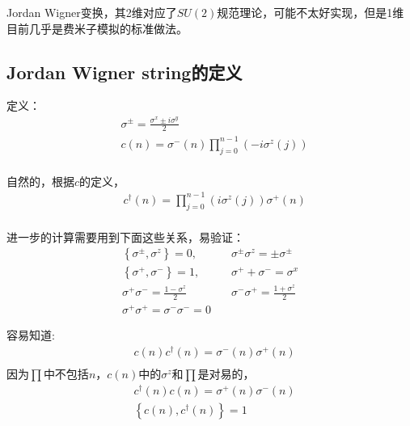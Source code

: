 Jordan Wigner变换，其2维对应了$SU(2)$规范理论，可能不太好实现，但是1维目前几乎是费米子模拟的标准做法。

\subsection{Jordan Wigner string的定义}

定义：
\begin{equation}
\begin{split}
&\sigma ^{\pm} = \frac{\sigma ^x \pm i \sigma ^y}{2}\\
&c(n)=\sigma ^-(n)\prod _{j=0}^{n-1}\left(-i\sigma ^z(j)\right)\\
\end{split}
\end{equation}

自然的，根据$c$的定义，
\begin{equation}
\begin{split}
&c^{\dagger}(n)=\prod _{j=0}^{n-1}\left(i\sigma ^z(j)\right)\sigma ^+(n)\\
\end{split}
\end{equation}

进一步的计算需要用到下面这些关系，易验证：
\begin{equation}
\begin{split}
\left\{\sigma ^{\pm}, \sigma ^z\right\}=0,\quad & \sigma ^{\pm}\sigma ^z = \pm \sigma ^{\pm}\\
\left\{\sigma ^+, \sigma ^-\right\}=1, \quad & \sigma ^++\sigma ^- = \sigma ^x\\
\sigma ^+\sigma ^- = \frac{1-\sigma ^z}{2} \quad & \sigma ^-\sigma ^+ = \frac{1+\sigma ^z}{2}\\
\sigma^+\sigma^+=\sigma^-\sigma^-=0 \quad & 
\end{split}
\end{equation}

容易知道:
\begin{equation}
\begin{split}
&c(n) c^{\dagger}(n) = \sigma ^-(n)\sigma ^+(n)\\
\end{split}
\end{equation}
因为$\prod $中不包括$n$，$c(n)$中的$\sigma ^z$和$\prod$是对易的，
\begin{equation}
\begin{split}
&c^{\dagger}(n) c(n) = \sigma ^+(n)\sigma ^-(n)\\
&\left\{ c(n),c^{\dagger}(n)\right\} = 1\\
\end{split}
\end{equation}

